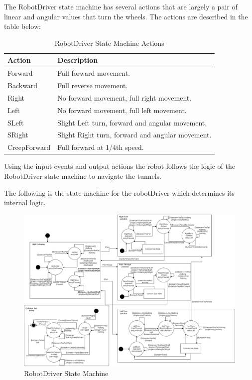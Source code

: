 \documentclass[12pt]{report}
\begin{document}
The RobotDriver state machine has several actions that are largely a pair of linear and angular values that turn the wheels. The actions are described in the table below:
\begin{table}[H]
\centering
\caption{RobotDriver State Machine Actions}
\label{State Machine Actions}
\centering
\begin{tabular} { | p{3cm} | p{10cm} | }
\hline
\textbf{Action} & \textbf{Description} \\
\hline
Forward & Full forward movement. \\
\hline
Backward & Full reverse movement. \\
\hline
Right & No forward movement, full right movement. \\
\hline
Left & No forward movement, full left movement. \\
\hline
SLeft & Slight Left turn, forward and angular movement. \\
\hline
SRight & Slight Right turn, forward and angular movement. \\
\hline
CreepForward & Full forward at 1/4th speed.\\
\hline
\end{tabular}
\end{table}%

Using the input events and output actions the robot follows the logic of the RobotDriver state machine to navigate the tunnels.

The following is the state machine for the robotDriver which determines its internal logic.

\begin{figure}[H]
\caption{RobotDriver State Machine}
\centering
\hspace*{-2cm}
\includegraphics[scale=0.38]{images/RobotDriverStateMachine.png}
\centering
\end{figure}
\end{document}
